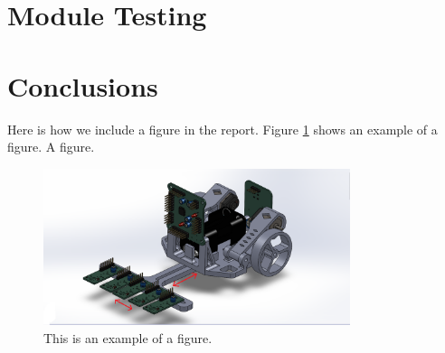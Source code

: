 \documentclass[12pt]{article}
\begin{document}
\newpage

\section{Module Testing}

\newpage

\section{Conclusions}


\newpage


\printbibliography

\newpage
\appendix

Here is how we include a figure in the report. Figure \ref{fig:example} shows an example of a figure. A figure.

\begin{figure}[H]
  \centering
  \includegraphics[width=0.8\textwidth]{example.png}
  \caption{This is an example of a figure.}
  \label{fig:example}
\end{figure}
\end{document}
